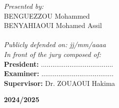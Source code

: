 \begin{spacing}{1.5}
  \noindent
  \textit{Presented by:} \\
  BENGUEZZOU Mohammed \\
  BENYAHIAOUI Mohamed Assil\\
  ~~\\
  \textit{Publicly defended on: jj/mm/aaaa} \\
  \textit{In front of the jury composed of:} \\
  \textbf{President:} ...................................... \\
  \textbf{Examiner:} ...................................... \\
  \textbf{Supervisor:} Dr. ZOUAOUI Hakima \\
  \centerline{\textbf{2024/2025}}

\end{spacing}



